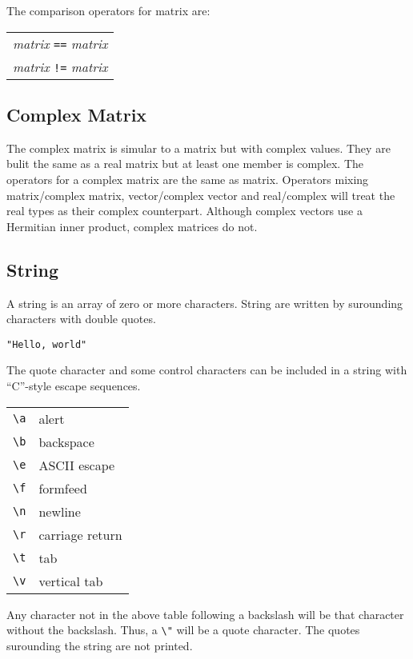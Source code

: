 \documentclass{article}
\begin{document}
The comparison operators for matrix are:
\begin{center}
  \begin{tabular}{c}
    \emph{matrix} \verb|==| \emph{matrix} \\
    \emph{matrix} \verb|!=| \emph{matrix} \\
  \end{tabular}
\end{center}

\subsection{Complex Matrix}
The complex matrix is simular to a matrix but with complex values.
They are bulit the same as a real matrix but at least one member is complex.
The operators for a complex matrix are the same as matrix.
Operators mixing matrix/complex matrix, vector/complex vector and real/complex
will treat the real types as their complex counterpart.
Although complex vectors use a Hermitian inner product, complex matrices do not.

\subsection{String}
A string is an array of zero or more characters.
String are written by surounding characters with double quotes.
\begin{verbatim}
"Hello, world"
\end{verbatim}
The quote character and some control characters can be included
in a string with ``C''-style escape sequences.
\begin{center}
  \begin{tabular}{cl}
    \verb|\a| & alert \\
    \verb|\b| & backspace \\
    \verb|\e| & ASCII escape \\
    \verb|\f| & formfeed \\
    \verb|\n| & newline \\
    \verb|\r| & carriage return \\
    \verb|\t| & tab \\
    \verb|\v| & vertical tab \\
  \end{tabular}
\end{center}

Any character not in the above table following a backslash will be that
character without the backslash. Thus, a \verb|\"| will be a quote
character.
The quotes surounding the string are not printed.
\end{document}
